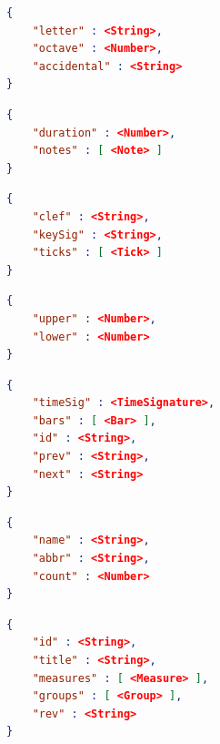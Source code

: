 \documentclass[letterpaper,12pt]{article}
\begin{document}
\begin{lstlisting}[language=json, caption=Note]
{
    "letter" : <String>,
    "octave" : <Number>,
    "accidental" : <String>
}
\end{lstlisting}

\begin{lstlisting}[language=json, caption=Tick]
{
    "duration" : <Number>,
    "notes" : [ <Note> ]
}
\end{lstlisting}

\begin{lstlisting}[language=json, caption=Bar]
{
    "clef" : <String>,
    "keySig" : <String>,
    "ticks" : [ <Tick> ]
}
\end{lstlisting}

\begin{lstlisting}[language=json, caption=TimeSignature]
{
    "upper" : <Number>,
    "lower" : <Number>
}
\end{lstlisting}

\begin{lstlisting}[language=json, caption=Measure]
{
    "timeSig" : <TimeSignature>,
    "bars" : [ <Bar> ],
    "id" : <String>,
    "prev" : <String>,
    "next" : <String>
}
\end{lstlisting}

\begin{lstlisting}[language=json, caption=Group]
{
    "name" : <String>,
    "abbr" : <String>,
    "count" : <Number>
}
\end{lstlisting}

\begin{lstlisting}[language=json, caption=MusicScore]
{
    "id" : <String>,
    "title" : <String>,
    "measures" : [ <Measure> ],
    "groups" : [ <Group> ],
    "rev" : <String>
}
\end{lstlisting}
\end{document}
